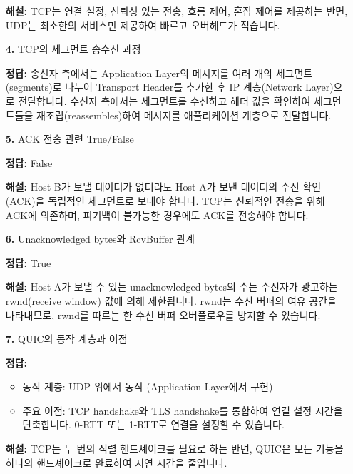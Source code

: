 \documentclass[a4paper, 10pt]{article}
\begin{document}
\begin{enumerate}[itemsep=2.5em, leftmargin=2em, label={}]
\small\textbf{해설:} TCP는 연결 설정, 신뢰성 있는 전송, 흐름 제어, 혼잡 제어를 제공하는 반면, UDP는 최소한의 서비스만 제공하여 빠르고 오버헤드가 적습니다.

\item[\textbf{4.}] TCP의 세그먼트 송수신 과정
\vspace{0.5em}

\noindent\textbf{정답:} 송신자 측에서는 Application Layer의 메시지를 여러 개의 세그먼트(segments)로 나누어 Transport Header를 추가한 후 IP 계층(Network Layer)으로 전달합니다. 수신자 측에서는 세그먼트를 수신하고 헤더 값을 확인하여 세그먼트들을 재조립(reassembles)하여 메시지를 애플리케이션 계층으로 전달합니다.

\item[\textbf{5.}] ACK 전송 관련 True/False
\vspace{0.5em}

\noindent\textbf{정답:} False

\small\textbf{해설:} Host B가 보낼 데이터가 없더라도 Host A가 보낸 데이터의 수신 확인(ACK)을 독립적인 세그먼트로 보내야 합니다. TCP는 신뢰적인 전송을 위해 ACK에 의존하며, 피기백이 불가능한 경우에도 ACK를 전송해야 합니다.

\item[\textbf{6.}] Unacknowledged bytes와 RcvBuffer 관계
\vspace{0.5em}

\noindent\textbf{정답:} True

\small\textbf{해설:} Host A가 보낼 수 있는 unacknowledged bytes의 수는 수신자가 광고하는 rwnd(receive window) 값에 의해 제한됩니다. rwnd는 수신 버퍼의 여유 공간을 나타내므로, rwnd를 따르는 한 수신 버퍼 오버플로우를 방지할 수 있습니다.

\item[\textbf{7.}] QUIC의 동작 계층과 이점
\vspace{0.5em}

\noindent\textbf{정답:}
\begin{itemize}[itemsep=0.3em]
    \item 동작 계층: UDP 위에서 동작 (Application Layer에서 구현)
    \item 주요 이점: TCP handshake와 TLS handshake를 통합하여 연결 설정 시간을 단축합니다. 0-RTT 또는 1-RTT로 연결을 설정할 수 있습니다.
\end{itemize}

\small\textbf{해설:} TCP는 두 번의 직렬 핸드셰이크를 필요로 하는 반면, QUIC은 모든 기능을 하나의 핸드셰이크로 완료하여 지연 시간을 줄입니다.


\end{enumerate}
\end{document}

